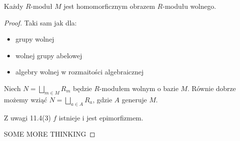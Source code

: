 \begin{remark}
  Każdy $R$-moduł $M$ jest homomorficznym obrazem $R$-modułu wolnego.
\end{remark}
\begin{proof}
  Taki sam jak dla:
  \begin{itemize}
    \item grupy wolnej
    \item wolnej grupy abelowej
    \item algebry wolnej w rozmaitości algebraicznej
  \end{itemize}

  Niech $N=\bigsqcup_{m\in M}R_m$ będzie $R$-modułem wolnym o bazie $M$. Równie dobrze możemy wziąć $N=\bigsqcup_{a\in A} R_a$, gdzie $A$ generuje $M$.

  \begin{center}
  \end{center}

  Z uwagi 11.4(3) $f$ istnieje i jest epimorfizmem.

  {\large\color{orange}SOME MORE THINKING}
\end{proof}

